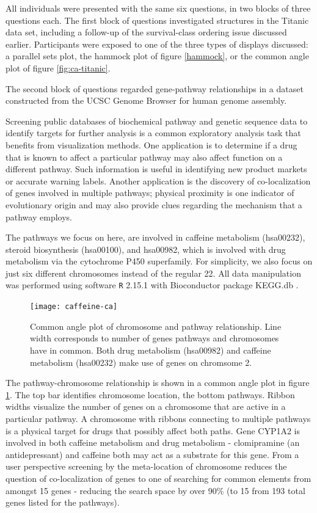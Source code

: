  All individuals were presented with the same six questions, in two blocks of three questions each. The first block of questions investigated structures in the Titanic data set, including a follow-up of the survival-class ordering issue discussed earlier. Participants were exposed to one of the three types of displays discussed: a parallel sets plot, the hammock plot of figure \ref{hammock}, or the common angle plot of  figure \ref{fig:ca-titanic}.
 
The second block  of questions regarded gene-pathway relationships in a dataset constructed from the UCSC Genome Browser \cite{ucsc:2002} for human genome assembly. 

Screening public databases of biochemical pathway and genetic sequence data to identify targets for further analysis is a common exploratory analysis task that benefits from visualization methods. One application is to determine if a drug that is known to affect a particular pathway may also affect function on a different pathway. Such information is useful in identifying new product markets or accurate warning labels. Another application is the discovery of co-localization of genes involved in multiple pathways; physical proximity is one indicator of evolutionary origin and may also provide clues regarding the mechanism that a pathway employs.


The pathways we focus on here, are involved in caffeine metabolism (hsa00232),  steroid biosynthesis (hsa00100), and hsa00982, which is involved with drug metabolism via the cytochrome P450 superfamily. For simplicity, we also focus on just six different chromosomes instead of the regular 22.  All data manipulation was performed  using software {\tt R} 2.15.1 \citep{R} with Bioconductor package KEGG.db \cite{kegg}.

\begin{figure}[htbp] %
   \centering
   \texttt{[image: caffeine-ca]} 
   \caption{\label{fig:caffeine}Common angle plot of chromosome and pathway relationship. Line width corresponds to number of genes pathways and chromosomes have in common. Both drug metabolism (hsa00982) and caffeine metabolism (hsa00232) make use of genes on chromsome 2.}
\end{figure}

The pathway-chromosome relationship is shown in a common angle plot in figure \ref{fig:caffeine}. The top bar identifies chromosome location, the bottom pathways. Ribbon widths  visualize the number of genes on a  chromosome that are active in a particular pathway.  A chromosome with ribbons connecting to multiple pathways is a physical target for drugs that possibly affect both paths.  Gene CYP1A2 is involved in both caffeine metabolism and drug metabolism - clomipramine (an antidepressant) and caffeine both may act as a substrate for this gene. From a user perspective screening by the meta-location of chromosome reduces the  question of co-localization of genes to one of searching for common elements from amongst 15 genes  - reducing the search space by over 90\% (to 15 from 193 total genes listed for the pathways).

